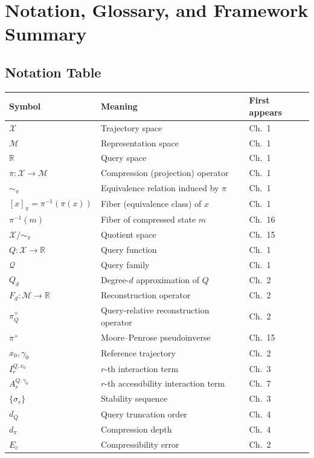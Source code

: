 \chapter{Notation, Glossary, and Framework Summary}

\section{Notation Table}

\begin{center}\small
\begin{tabular}{lll}
\toprule
Symbol & Meaning & First appears \\
\midrule
$\mathcal{X}$ & Trajectory space & Ch.~1 \\
$\mathcal{M}$ & Representation space & Ch.~1 \\
$\mathbb{R}$ & Query space & Ch.~1 \\
$\pi : \mathcal{X} \to \mathcal{M}$ & Compression (projection) operator & Ch.~1 \\
$\sim_\pi$ & Equivalence relation induced by $\pi$ & Ch.~1 \\
$[x]_\pi = \pi^{-1}(\pi(x))$ & Fiber (equivalence class) of $x$ & Ch.~1 \\
$\pi^{-1}(m)$ & Fiber of compressed state $m$ & Ch.~16 \\
$\mathcal{X}/{\sim_\pi}$ & Quotient space & Ch.~15 \\
$Q : \mathcal{X} \to \mathbb{R}$ & Query function & Ch.~1 \\
$\mathcal{Q}$ & Query family & Ch.~1 \\
$Q_d$ & Degree-$d$ approximation of $Q$ & Ch.~2 \\
$F_d : \mathcal{M} \to \mathbb{R}$ & Reconstruction operator & Ch.~2 \\
$\pi^+_Q$ & Query-relative reconstruction operator & Ch.~2 \\
$\pi^+$ & Moore--Penrose pseudoinverse & Ch.~15 \\
$x_0, \gamma_0$ & Reference trajectory & Ch.~2 \\
$I_r^{Q,x_0}$ & $r$-th interaction term & Ch.~3 \\
$A_r^{Q,\gamma_0}$ & $r$-th accessibility interaction term & Ch.~7 \\
$\{\sigma_r\}$ & Stability sequence & Ch.~3 \\
$d_Q$ & Query truncation order & Ch.~4 \\
$d_\pi$ & Compression depth & Ch.~4 \\
$E_c$ & Compressibility error & Ch.~2 \\

\end{tabular}
\end{center}
